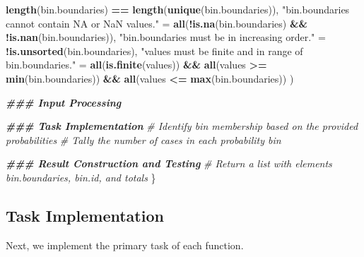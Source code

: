 \documentclass[
]{book}
\newenvironment{Shaded}{\begin{snugshade}}{\end{snugshade}}
\newcommand{\CommentTok}[1]{\textcolor[rgb]{0.56,0.35,0.01}{\textit{#1}}}
\newcommand{\DocumentationTok}[1]{\textcolor[rgb]{0.56,0.35,0.01}{\textbf{\textit{#1}}}}
\newcommand{\FunctionTok}[1]{\textcolor[rgb]{0.13,0.29,0.53}{\textbf{#1}}}
\newcommand{\NormalTok}[1]{#1}
\newcommand{\OtherTok}[1]{\textcolor[rgb]{0.56,0.35,0.01}{#1}}
\newcommand{\SpecialCharTok}[1]{\textcolor[rgb]{0.81,0.36,0.00}{\textbf{#1}}}
\newcommand{\StringTok}[1]{\textcolor[rgb]{0.31,0.60,0.02}{#1}}
\begin{document}
\begin{Shaded}
\begin{Highlighting}[]
      \FunctionTok{length}\NormalTok{(bin.boundaries) }\SpecialCharTok{==} \FunctionTok{length}\NormalTok{(}\FunctionTok{unique}\NormalTok{(bin.boundaries)),}
    \StringTok{"\textasciigrave{}bin.boundaries\textasciigrave{} cannot contain NA or NaN values."} \OtherTok{=} 
      \FunctionTok{all}\NormalTok{(}\SpecialCharTok{!}\FunctionTok{is.na}\NormalTok{(bin.boundaries) }\SpecialCharTok{\&\&} \SpecialCharTok{!}\FunctionTok{is.nan}\NormalTok{(bin.boundaries)),}
    \StringTok{"\textasciigrave{}bin.boundaries\textasciigrave{} must be in increasing order."} \OtherTok{=} \SpecialCharTok{!}\FunctionTok{is.unsorted}\NormalTok{(bin.boundaries),}
    \StringTok{"\textasciigrave{}values\textasciigrave{} must be finite and in range of \textasciigrave{}bin.boundaries\textasciigrave{}."} \OtherTok{=} 
      \FunctionTok{all}\NormalTok{(}\FunctionTok{is.finite}\NormalTok{(values)) }\SpecialCharTok{\&\&} \FunctionTok{all}\NormalTok{(values }\SpecialCharTok{\textgreater{}=} \FunctionTok{min}\NormalTok{(bin.boundaries)) }\SpecialCharTok{\&\&} 
      \FunctionTok{all}\NormalTok{(values }\SpecialCharTok{\textless{}=} \FunctionTok{max}\NormalTok{(bin.boundaries))}
\NormalTok{  )}
  
  \DocumentationTok{\#\#\# Input Processing}
  
  \DocumentationTok{\#\#\# Task Implementation}
  \CommentTok{\# Identify bin membership based on the provided probabilities}
  \CommentTok{\# Tally the number of cases in each probability bin}
  
  \DocumentationTok{\#\#\# Result Construction and Testing}
  \CommentTok{\# Return a list with elements \textasciigrave{}bin.boundaries\textasciigrave{}, \textasciigrave{}bin.id\textasciigrave{}, and \textasciigrave{}totals\textasciigrave{}}
\NormalTok{\}}
\end{Highlighting}
\end{Shaded}

\hypertarget{task-implementation-1}{%
\subsection{Task Implementation}\label{task-implementation-1}}

Next, we implement the primary task of each function.
\end{document}
